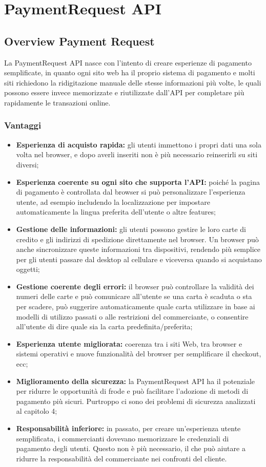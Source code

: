 \documentclass[11pt ,a4paper , twoside , openright ]{article}
\begin{document}
\section{PaymentRequest API}

\subsection{Overview Payment Request}
La PaymentRequest API \cite{rif9} nasce con l'intento di creare esperienze di pagamento semplificate, in quanto ogni sito web ha il proprio sistema di pagamento e molti siti richiedono la ridigitazione manuale delle stesse informazioni più volte, le quali possono essere invece memorizzate e riutilizzate dall'API per completare più rapidamente le transazioni online.

\subsubsection{Vantaggi \cite{rif13}}
\begin{itemize}
	\item \textbf{Esperienza di acquisto rapida:} gli utenti immettono i propri dati una sola volta nel browser, e dopo averli inseriti non è più necessario reinserirli su siti diversi;
	\item \textbf{Esperienza coerente su ogni sito che supporta l'API:} poiché la pagina di pagamento è controllata dal browser si può personalizzare l'esperienza utente, ad esempio includendo la localizzazione per impostare automaticamente la lingua preferita dell'utente o altre features;
	\item \textbf{Gestione delle informazioni:} gli utenti possono gestire le loro carte di credito e gli indirizzi di spedizione direttamente nel browser. Un browser può anche sincronizzare queste informazioni tra dispositivi, rendendo più semplice per gli utenti passare dal desktop al cellulare e viceversa quando si acquistano oggetti;
	\item \textbf{Gestione coerente degli errori:} il browser può controllare la validità dei numeri delle carte e può comunicare all'utente se una carta è scaduta o sta per scadere, può suggerire automaticamente quale carta utilizzare in base ai modelli di utilizzo passati o alle restrizioni del commerciante, o consentire all'utente di dire quale sia la carta predefinita/preferita;
	\item \textbf{Esperienza utente migliorata:} coerenza tra i siti Web, tra browser e sistemi operativi e nuove funzionalità del browser per semplificare il checkout, ecc;
	\item \textbf{Miglioramento della sicurezza:} la PaymentRequest API ha il potenziale per ridurre le opportunità di frode e può facilitare l'adozione di metodi di pagamento più sicuri. Purtroppo ci sono dei problemi di sicurezza analizzati al capitolo 4; 
	\item \textbf{Responsabilità inferiore:} in passato, per creare un'esperienza utente semplificata, i commercianti dovevano memorizzare le credenziali di pagamento degli utenti. Questo non è più necessario, il che può aiutare a ridurre la responsabilità del commerciante nei confronti del cliente.
\end{itemize}
\end{document}
